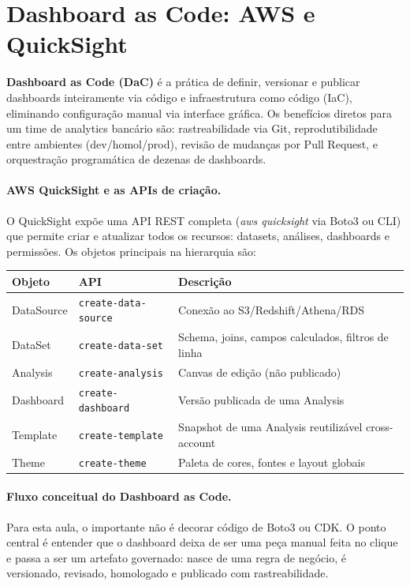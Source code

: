 \section{Dashboard as Code: AWS e QuickSight}
\label{sec:daac}

\textbf{Dashboard as Code (DaC)} é a prática de definir, versionar e publicar dashboards inteiramente via código e infraestrutura como código (IaC), eliminando configuração manual via interface gráfica. Os benefícios diretos para um time de analytics bancário são: rastreabilidade via Git, reprodutibilidade entre ambientes (dev/homol/prod), revisão de mudanças por Pull Request, e orquestração programática de dezenas de dashboards.

\paragraph{AWS QuickSight e as APIs de criação.}
O QuickSight expõe uma API REST completa (\textit{aws quicksight} via Boto3 ou CLI) que permite criar e atualizar todos os recursos: datasets, análises, dashboards e permissões. Os objetos principais na hierarquia são:

\begin{BoardBox}[title=Hierarquia de Objetos no QuickSight]
\begin{tabular}{@{}llp{6.5cm}@{}}
\toprule
\textbf{Objeto} & \textbf{API} & \textbf{Descrição} \\
\midrule
DataSource    & \texttt{create-data-source}    & Conexão ao S3/Redshift/Athena/RDS \\
DataSet       & \texttt{create-data-set}       & Schema, joins, campos calculados, filtros de linha \\
Analysis      & \texttt{create-analysis}       & Canvas de edição (não publicado) \\
Dashboard     & \texttt{create-dashboard}      & Versão publicada de uma Analysis \\
Template      & \texttt{create-template}       & Snapshot de uma Analysis reutilizável cross-account \\
Theme         & \texttt{create-theme}          & Paleta de cores, fontes e layout globais \\
\bottomrule
\end{tabular}
\end{BoardBox}

\paragraph{Fluxo conceitual do Dashboard as Code.}
Para esta aula, o importante não é decorar código de Boto3 ou CDK. O ponto central é entender que o dashboard deixa de ser uma peça manual feita no clique e passa a ser um artefato governado: nasce de uma regra de negócio, é versionado, revisado, homologado e publicado com rastreabilidade.

